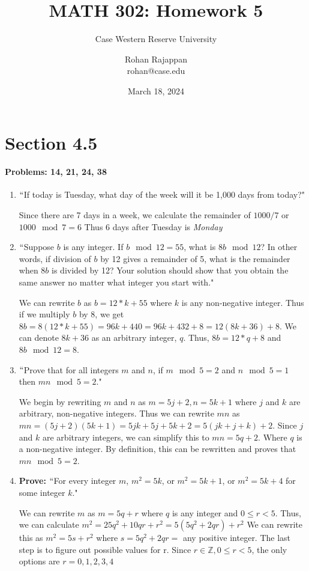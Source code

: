 \documentclass{article}
\title{MATH 302: Homework 5}
\subtitle{Case Western Reserve University}
\author{Rohan Rajappan \\rohan@case.edu}
\date{March 18, 2024}
\makeatletter
\newcommand\setItemnumber[1]{\setcounter{enum\romannumeral\@enumdepth}{\numexpr#1-1\relax}}
\makeatother
\begin{document}
\maketitle

\section{Section 4.5}
 \paragraph{Problems: 14, 21, 24, 38}
 \begin{enumerate}
     \setItemnumber{14}
     \item $``$If today is Tuesday, what day of the week will it be 1,000 days from today?"

     Since there are 7 days in a week, we calculate the remainder of $1000/7$ or $1000\mod{7} = 6$ Thus 6 days after Tuesday is \textit{Monday}
     \setItemnumber{21}
     \item $``$Suppose $b$ is any integer. If $b \mod{12} = 55$, what is $8b \mod{12}$? In other words, if division of $b$ by 12 gives a remainder of 5, what is the remainder when $8b$ is divided by 12? Your solution should show that you obtain the same answer no matter what integer you start with."

     We can rewrite $b$ as $b = 12*k + 55$ where $k$ is any non-negative integer. Thus if we multiply $b$ by 8, we get $8b = 8(12*k + 55) = 96k + 440 = 96k+432+8 = 12(8k+36)+8$. We can denote $8k+36$ as an arbitrary integer, $q$. Thus, $8b = 12*q + 8$ and $8b\mod{12} = 8$.

     \setItemnumber{24}
     \item $``$Prove that for all integers $m$ and $n$, if $m \mod5 = 2$ and $n \mod{5}=1$ then $mn \mod{5}=2$."

     We begin by rewriting $m$ and $n$ as $m=5j+2, n=5k+1$ where $j$ and $k$ are arbitrary, non-negative integers. 
     Thus we can rewrite $mn$ as $mn=(5j+2)(5k+1) = 5jk+5j+5k+2 = 5(jk+j+k) + 2$. Since $j$ and $k$ are arbitrary integers, we can simplify this to $mn=5q+2$. Where $q$ is a non-negative integer. By definition, this can be rewritten and proves that $mn\mod{5}=2$.

     \setItemnumber{38}
     \item \textbf{Prove:} $``$For every integer $m$, $m^2=5k$, or $m^2=5k+1$, or $m^2=5k+4$ for some integer $k$."

     We can rewrite $m$ as $m=5q+r$ where $q$ is any integer and $0\leq r<5$. Thus, we can calculate $m^2 = 25q^2+10qr+r^2 = 5(5q^2+2qr)+r^2$ We can rewrite this as
     $m^2=5s+r^2$ where $s = 5q^2+2qr = $ any positive integer. The last step is to figure out possible values for r. Since $r\in\mathbb{Z}, 0\leq r<5$,
     the only options are $r=0,1,2,3,4$ 
     

\end{enumerate}
\end{document}
